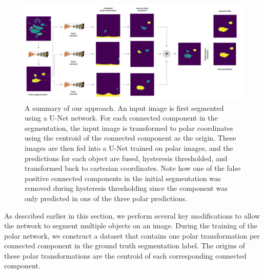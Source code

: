 \begin{figure}[h]
\centering
\includegraphics[width=\textwidth]{images/4/summary}
\caption{A summary of our approach. An input image is first segmented using a U-Net network. For each connected component in the segmentation, the input image is transformed to polar coordinates using the centroid of the connected component as the origin. These images are then fed into a U-Net trained on polar images, and the predictions for each object are fused, hysteresis thresholded, and transformed back to cartesian coordinates. Note how one of the false positive connected components in the initial segmentation was removed during hysteresis thresholding since the component was only predicted in one of the three polar predictions. \cite{bencevicUsingPolarTransform2022a}}
\label{fig:summary}
\end{figure}

As described earlier in this section, we perform several key modifications to allow the network to segment multiple objects on an image. During the training of the polar network, we construct a dataset that contains one polar transformation per connected component in the ground truth segmentation label. The origins of these polar transformations are the centroid of each corresponding connected component.

